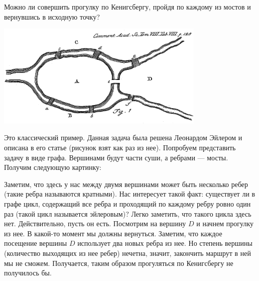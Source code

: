 \begin{task}
    Можно ли совершить прогулку по Кенигсбергу, пройдя по каждому
    из мостов и вернувшись в исходную точку?
\end{task}
\begin{center}
    \includegraphics[width=10cm]{bridges-euler}
\end{center}

Это классический пример. Данная задача была решена Леонардом 
Эйлером и описана в его статье (рисунок взят как раз из нее).
Попробуем представить задачу в виде графа. Вершинами будут
части суши, а ребрами --- мосты. Получим следующую картинку:

\begin{center}
\end{center}

Заметим, что здесь у нас между двумя вершинами может быть
несколько ребер (такие ребра называются кратными).
Нас интересует такой факт: существует ли в графе цикл,
содержащий все ребра и проходящий по каждому ребру ровно один
раз (такой цикл называется эйлеровым)? Легко заметить, что
такого цикла здесь нет. Действительно, пусть он есть.
Посмотрим на вершину $D$ и начнем прогулку из нее.
В какой-то момент мы должны вернуться. Заметим, что каждое
посещение вершины $D$ использует два новых ребра из нее. Но
степень вершины (количество выходящих из нее ребер) нечетна,
значит, закончить маршрут в ней мы не сможем. Получается,
таким образом прогуляться по Кенигсбергу не получилось бы.


